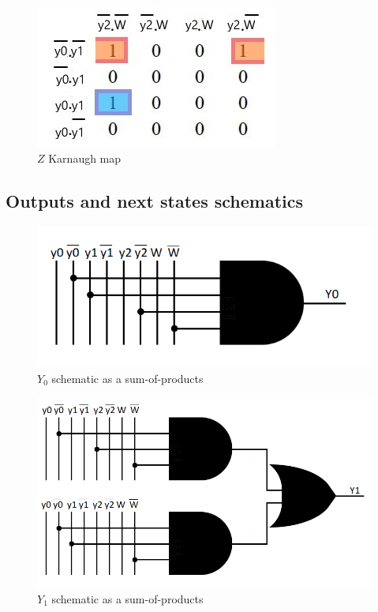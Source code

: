 \documentclass[../../e3_tp3_main.tex]{subfiles}
\begin{document}
\begin{figure}[H]
	\centering
	\includegraphics[scale=1]{figures/e3_tp3_ej2_moore_z_kmap.jpg}
	\caption{$Z$ Karnaugh map}
\end{figure}


\subsection{Outputs and next states schematics}
\begin{figure}[H]
	\centering
	\includegraphics{figures/Y0_schem.PNG}
	\caption{$Y_0$ schematic as a sum-of-products}
\end{figure}
\begin{figure}[H]
	\centering
	\includegraphics{figures/Y1_schem.PNG}
	\caption{$Y_1$ schematic as a sum-of-products}
\end{figure}
\end{document}
